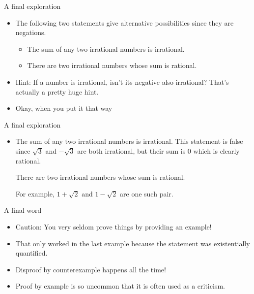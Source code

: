 \documentclass[landscape]{beamer}
\begin{document}
\begin{frame}{A final exploration}
\begin{itemize}
\item The following two statements give alternative possibilities since they are negations. \pause
\begin{itemize}
\item The sum of any two irrational numbers is irrational. \pause
\item There are two irrational numbers whose sum is rational. \pause
\end{itemize}
\item Hint: If a number is irrational, isn't its negative also irrational?  \pause That's actually a pretty huge hint.\pause
\item Okay, when you put it that way\textellipsis

\end{itemize}
\end{frame}


\begin{frame}{A final exploration}
\begin{itemize}

\item The sum of any two irrational numbers is irrational. \pause \newline
This statement is false since $\sqrt{3}$ and $-\sqrt{3}$ are both irrational, but their sum is $0$ which is clearly rational. \pause

\begin{thm*}
There are two irrational numbers whose sum is rational. 
\end{thm*}
\pause 
For example, $1+\sqrt{2}$ and $1-\sqrt{2}$ are one such pair. 
\end{itemize}
\end{frame}


\begin{frame}{A final word}
\begin{itemize}

\item Caution:  You very seldom prove things by providing an example! \pause 
\item That only worked in the last example because the statement was existentially quantified. \pause
\item Disproof by counterexample happens all the time! \pause 
\item Proof by example is so uncommon that it is often used as a criticism.

\end{itemize}
\end{frame}
\end{document}
